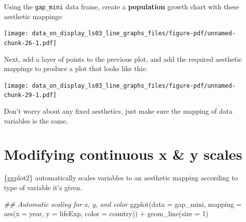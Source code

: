 \documentclass[
  letterpaper,
  DIV=11,
  numbers=noendperiod]{scrreprt}
\newenvironment{Shaded}{\begin{snugshade}}{\end{snugshade}}
\newcommand{\AttributeTok}[1]{\textcolor[rgb]{0.40,0.45,0.13}{#1}}
\newcommand{\DecValTok}[1]{\textcolor[rgb]{0.68,0.00,0.00}{#1}}
\newcommand{\DocumentationTok}[1]{\textcolor[rgb]{0.37,0.37,0.37}{\textit{#1}}}
\newcommand{\FunctionTok}[1]{\textcolor[rgb]{0.28,0.35,0.67}{#1}}
\newcommand{\NormalTok}[1]{\textcolor[rgb]{0.00,0.23,0.31}{#1}}
\newcommand{\SpecialCharTok}[1]{\textcolor[rgb]{0.37,0.37,0.37}{#1}}
\begin{document}
\begin{tcolorbox}[enhanced jigsaw, colframe=quarto-callout-tip-color-frame, colbacktitle=quarto-callout-tip-color!10!white, titlerule=0mm, opacitybacktitle=0.6, breakable, toprule=.15mm, arc=.35mm, rightrule=.15mm, colback=white, bottomrule=.15mm, opacityback=0, toptitle=1mm, left=2mm, bottomtitle=1mm, title=\textcolor{quarto-callout-tip-color}{\faLightbulb}\hspace{0.5em}{Practice}, leftrule=.75mm, coltitle=black]

Using the \texttt{gap\_mini} data frame, create a \textbf{population}
growth chart with these aesthetic mappings:

\texttt{[image: data\_on\_display\_ls03\_line\_graphs\_files/figure-pdf/unnamed-chunk-26-1.pdf]}

Next, add a layer of points to the previous plot, and add the required
aesthetic mappings to produce a plot that looks like this:

\texttt{[image: data\_on\_display\_ls03\_line\_graphs\_files/figure-pdf/unnamed-chunk-29-1.pdf]}

Don't worry about any fixed aesthetics, just make sure the mapping of
data variables is the same.

\end{tcolorbox}

\hypertarget{modifying-continuous-x-y-scales}{%
\section{Modifying continuous x \& y
scales}\label{modifying-continuous-x-y-scales}}

\{ggplot2\} automatically scales variables to an aesthetic mapping
according to type of variable it's given.

\begin{Shaded}
\begin{Highlighting}[]
\DocumentationTok{\#\# Automatic scaling for x, y, and color}
\FunctionTok{ggplot}\NormalTok{(}\AttributeTok{data =}\NormalTok{ gap\_mini,}
       \AttributeTok{mapping =} \FunctionTok{aes}\NormalTok{(}\AttributeTok{x =}\NormalTok{ year,}
                     \AttributeTok{y =}\NormalTok{ lifeExp,}
                     \AttributeTok{color =}\NormalTok{ country)) }\SpecialCharTok{+}
  \FunctionTok{geom\_line}\NormalTok{(}\AttributeTok{size =} \DecValTok{1}\NormalTok{)}
\end{Highlighting}
\end{Shaded}
\end{document}
